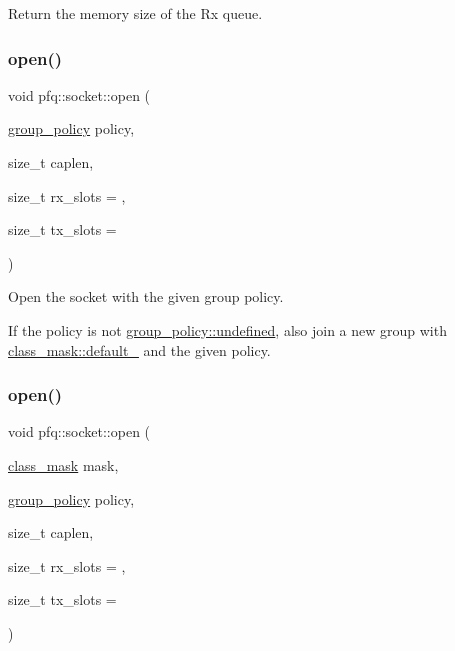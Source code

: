 Return the memory size of the Rx queue. 

\mbox{\label{classpfq_1_1socket_a432ea40ac382d251b105e3d5987b9b4a}} 
\subsubsection{\texorpdfstring{open()}{open()}\hspace{0.1cm}{\footnotesize\ttfamily [1/3]}}
{\footnotesize\ttfamily void pfq\+::socket\+::open (\begin{DoxyParamCaption}\item[{\hyperlink{namespacepfq_ac41249c8510558905b01fa4d866a38d7}{group\+\_\+policy}}]{policy,  }\item[{size\+\_\+t}]{caplen,  }\item[{size\+\_\+t}]{rx\+\_\+slots = {},  }\item[{size\+\_\+t}]{tx\+\_\+slots = {} }\end{DoxyParamCaption})\hspace{0.3cm}{\ttfamily [inline]}}



Open the socket with the given group policy. 

If the policy is not \hyperlink{namespacepfq_ac41249c8510558905b01fa4d866a38d7a5e543256c480ac577d30f76f9120eb74}{group\+\_\+policy\+::undefined}, also join a new group with \hyperlink{namespacepfq_a96af1f5ed530eff563eb917516758fbba172b03053216c6158fe380805998ad6c}{class\+\_\+mask\+::default\+\_\+} and the given policy. \mbox{\label{classpfq_1_1socket_ab86880ccdfdd9f875e376c6c8d22a2bb}} 
\subsubsection{\texorpdfstring{open()}{open()}\hspace{0.1cm}{\footnotesize\ttfamily [2/3]}}
{\footnotesize\ttfamily void pfq\+::socket\+::open (\begin{DoxyParamCaption}\item[{\hyperlink{namespacepfq_a96af1f5ed530eff563eb917516758fbb}{class\+\_\+mask}}]{mask,  }\item[{\hyperlink{namespacepfq_ac41249c8510558905b01fa4d866a38d7}{group\+\_\+policy}}]{policy,  }\item[{size\+\_\+t}]{caplen,  }\item[{size\+\_\+t}]{rx\+\_\+slots = {},  }\item[{size\+\_\+t}]{tx\+\_\+slots = {} }\end{DoxyParamCaption})\hspace{0.3cm}{\ttfamily [inline]}}



